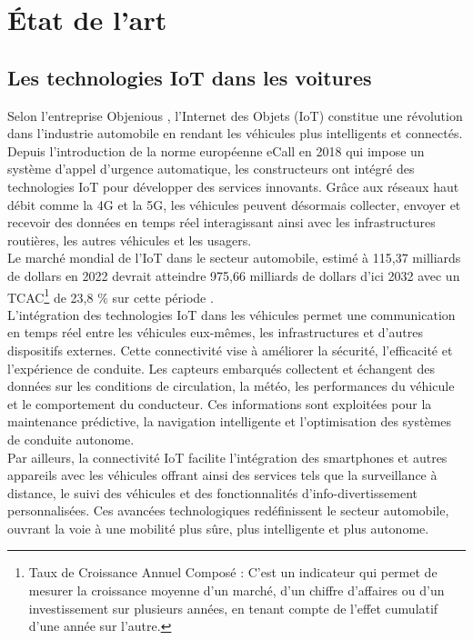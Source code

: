 \section{État de l'art}


\subsection{Les technologies IoT dans les voitures}

Selon l’entreprise Objenious \cite{noauthor_revolution_2025}, l’Internet des Objets (IoT) constitue une révolution dans l’industrie automobile en rendant les véhicules plus intelligents et connectés. Depuis l’introduction de la norme européenne eCall en 2018 qui impose un système d’appel d’urgence automatique, les constructeurs ont intégré des technologies IoT pour développer des services innovants. Grâce aux réseaux haut débit comme la 4G et la 5G, les véhicules peuvent désormais collecter, envoyer et recevoir des données en temps réel interagissant ainsi avec les infrastructures routières, les autres véhicules et les usagers.\\
Le marché mondial de l’IoT dans le secteur automobile, estimé à 115,37 milliards de dollars en 2022 devrait atteindre 975,66 milliards de dollars d’ici 2032 avec un TCAC\footnote{Taux de Croissance Annuel Composé : C’est un indicateur qui permet de mesurer la croissance moyenne d’un marché, d’un chiffre d’affaires ou d’un investissement sur plusieurs années, en tenant compte de l’effet cumulatif d’une année sur l’autre.} de 23,8 \% sur cette période \cite{noauthor_taille_2023}.\\
L’intégration des technologies IoT dans les véhicules permet une communication en temps réel entre les véhicules eux-mêmes, les infrastructures et d’autres dispositifs externes. Cette connectivité vise à améliorer la sécurité, l’efficacité et l’expérience de conduite. Les capteurs embarqués collectent et échangent des données sur les conditions de circulation, la météo, les performances du véhicule et le comportement du conducteur. Ces informations sont exploitées pour la maintenance prédictive, la navigation intelligente et l’optimisation des systèmes de conduite autonome.\\
Par ailleurs, la connectivité IoT facilite l’intégration des smartphones et autres appareils avec les véhicules offrant ainsi des services tels que la surveillance à distance, le suivi des véhicules et des fonctionnalités d’info-divertissement personnalisées. Ces avancées technologiques redéfinissent le secteur automobile, ouvrant la voie à une mobilité plus sûre, plus intelligente et plus autonome.



